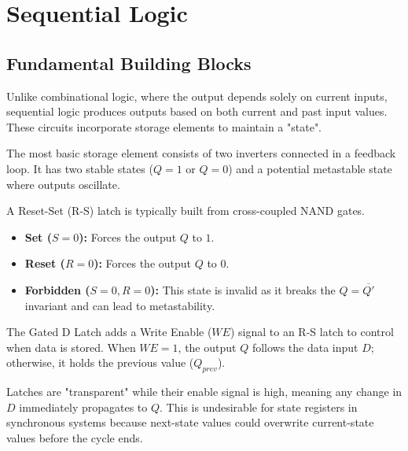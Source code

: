 \section{Sequential Logic}

\subsection{Fundamental Building Blocks}

\begin{definition}
Unlike combinational logic, where the output depends solely on current inputs, sequential logic produces outputs based on both current and past input values. These circuits incorporate storage elements to maintain a "state".
\end{definition}

\begin{definition}
The most basic storage element consists of two inverters connected in a feedback loop. It has two stable states ($Q=1$ or $Q=0$) and a potential metastable state where outputs oscillate.
\end{definition}

\begin{definition}
A Reset-Set (R-S) latch is typically built from cross-coupled NAND gates. 
\begin{itemize}
    \item \textbf{Set ($S=0$):} Forces the output $Q$ to $1$.
    \item \textbf{Reset ($R=0$):} Forces the output $Q$ to $0$.
    \item \textbf{Forbidden ($S=0, R=0$):} This state is invalid as it breaks the $Q = \overline{Q'}$ invariant and can lead to metastability.
\end{itemize}
\end{definition}


\begin{definition}
The Gated D Latch adds a Write Enable ($WE$) signal to an R-S latch to control when data is stored. When $WE=1$, the output $Q$ follows the data input $D$; otherwise, it holds the previous value ($Q_{prev}$).
\end{definition}


\begin{important}
Latches are "transparent" while their enable signal is high, meaning any change in $D$ immediately propagates to $Q$. This is undesirable for state registers in synchronous systems because next-state values could overwrite current-state values before the cycle ends.
\end{important}

